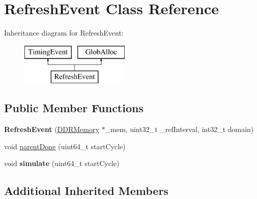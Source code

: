 \hypertarget{classRefreshEvent}{\section{Refresh\-Event Class Reference}
\label{classRefreshEvent}
}
Inheritance diagram for Refresh\-Event\-:\begin{figure}[H]
\begin{center}
\leavevmode
\includegraphics[height=2.000000cm]{classRefreshEvent}
\end{center}
\end{figure}
\subsection*{Public Member Functions}
\begin{DoxyCompactItemize}
\item 
\hypertarget{classRefreshEvent_acefefeb788013a0365ed66ba2296c211}{{\bfseries Refresh\-Event} (\hyperlink{classDDRMemory}{D\-D\-R\-Memory} $\ast$\-\_\-mem, uint32\-\_\-t \-\_\-ref\-Interval, int32\-\_\-t domain)}\label{classRefreshEvent_acefefeb788013a0365ed66ba2296c211}

\item 
void \hyperlink{classRefreshEvent_af9afce48ab90b3acbbe9c72bd5f7e552}{parent\-Done} (uint64\-\_\-t start\-Cycle)
\item 
\hypertarget{classRefreshEvent_a159c719260c727b66a28db40f8198dc7}{void {\bfseries simulate} (uint64\-\_\-t start\-Cycle)}\label{classRefreshEvent_a159c719260c727b66a28db40f8198dc7}

\end{DoxyCompactItemize}
\subsection*{Additional Inherited Members}


